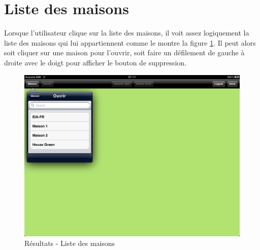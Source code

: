 \section{Liste des maisons} %
\label{sub:liste_des_maisons}
Lorsque l'utilisateur clique sur la liste des maisons, il voit assez logiquement la liste des maisons qui lui appartiennent comme le montre la figure \ref{gra:res05}. Il peut alors soit cliquer sur une maison pour l'ouvrir, soit faire un défilement de gauche à droite avec le doigt pour afficher le bouton de suppression.
\begin{figure}[H]
        \centering
        \includegraphics[width=\textwidth]{00_media/07_05.PNG}
        \caption{Résultats - Liste des maisons}
        \label{gra:res05}
\end{figure}

\clearpage


